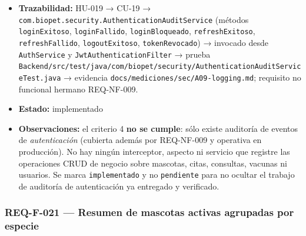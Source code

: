 \documentclass[
  spanish,
]{article}
\begin{document}
\begin{itemize}
  \texttt{docs/\allowbreak{}mediciones/\allowbreak{}sec/\allowbreak{}raw/\allowbreak{}A09-\allowbreak{}audit-\allowbreak{}logs.\allowbreak{}txt}. Criterio 4:
  \textbf{sin artefacto} --- ver Observaciones.
\item
  \textbf{Trazabilidad:} HU-019 → CU-19 →
  \texttt{com.\allowbreak{}biopet.\allowbreak{}security.\allowbreak{}Authentication\allowbreak{}Audit\allowbreak{}Service} (métodos
  \texttt{login\allowbreak{}Exitoso}, \texttt{login\allowbreak{}Fallido}, \texttt{login\allowbreak{}Bloqueado},
  \texttt{refresh\allowbreak{}Exitoso}, \texttt{refresh\allowbreak{}Fallido},
  \texttt{logout\allowbreak{}Exitoso}, \texttt{token\allowbreak{}Revocado}) → invocado desde
  \texttt{Auth\allowbreak{}Service} y \texttt{Jwt\allowbreak{}Authentication\allowbreak{}Filter} → prueba
  \texttt{Backend/\allowbreak{}src/\allowbreak{}test/\allowbreak{}java/\allowbreak{}com/\allowbreak{}biopet/\allowbreak{}security/\allowbreak{}Authentication\allowbreak{}Audit\allowbreak{}Service\allowbreak{}Test.\allowbreak{}java}
  → evidencia \texttt{docs/\allowbreak{}mediciones/\allowbreak{}sec/\allowbreak{}A09-\allowbreak{}logging.\allowbreak{}md}; requisito no
  funcional hermano REQ-NF-009.
\item
  \textbf{Estado:} implementado
\item
  \textbf{Observaciones:} el criterio 4 \textbf{no se cumple}: sólo
  existe auditoría de eventos de \emph{autenticación} (cubierta además
  por REQ-NF-009 y operativa en producción). No hay ningún interceptor,
  aspecto ni servicio que registre las operaciones CRUD de negocio sobre
  mascotas, citas, consultas, vacunas ni usuarios. Se marca
  \texttt{implementado} y no \texttt{pendiente} para no ocultar el
  trabajo de auditoría de autenticación ya entregado y verificado.
\end{itemize}

\subsubsection{REQ-F-021 --- Resumen de mascotas activas agrupadas por
especie}\label{req-f-021-resumen-de-mascotas-activas-agrupadas-por-especie}
\end{document}
